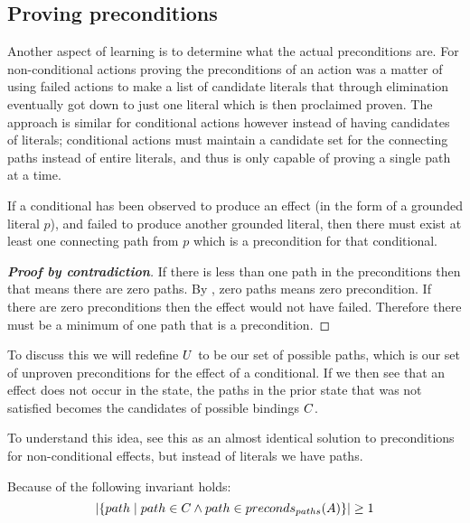 \documentclass[\master/Master.tex]{subfiles}
\begin{document}
\subsection{Proving preconditions}
Another aspect of learning is to determine what the actual preconditions are.
For non-conditional actions proving the preconditions of an action was a matter of using failed actions to make a list of candidate literals that through elimination eventually got down to just one literal which is then proclaimed proven. The approach is similar for conditional actions however instead of having candidates of literals; conditional actions must maintain a candidate set for the connecting paths instead of entire literals, and thus is only capable of proving a single path at a time.

\begin{theorem}\label{thm:minimum-one-binding}
    If a conditional has been observed to produce an effect (in the form of a grounded literal $p$), and failed to produce another grounded literal, then there must exist at least one connecting path from $p$ which is a precondition for that conditional.
\end{theorem}

\begin{proof}[\textbf{Proof by contradiction}] 
    If there is less than one path in the preconditions then that means there are zero paths. By , zero paths means zero precondition. If there are zero preconditions then the effect would not have failed. Therefore there must be a minimum of one path that is a precondition.
\end{proof}

To discuss this we will redefine $U$ to be our set of possible paths, which is our set of unproven preconditions for the effect of a conditional.
If we then see that an effect does not occur in the state, the paths in the prior state that was not satisfied becomes the candidates of possible bindings $C$. 

To understand this idea, see this as an almost identical solution to preconditions for non-conditional effects, but instead of literals we have paths.

Because of  the following invariant holds:
\begin{equation} \label{eq:binding_invariant}
\left| \{path  \mid  path \in C \land path \in preconds_{paths}(A)\} \right|  \ge 1
\end{equation}
\end{document}
